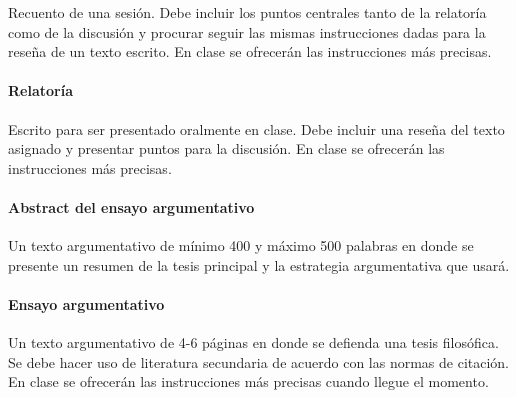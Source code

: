 \documentclass[]{article}
\let\oldparagraph\paragraph
\renewcommand{\paragraph}[1]{\oldparagraph{#1}\mbox{}}
\begin{document}
Recuento de una sesión. Debe incluir los puntos centrales tanto de la
relatoría como de la discusión y  procurar seguir las mismas
instrucciones dadas para la reseña de un texto escrito. En clase se
ofrecerán las instrucciones más precisas.

\paragraph{Relatoría}\label{relatoruxeda}

Escrito para ser presentado oralmente en clase. Debe incluir una reseña
del texto asignado y presentar puntos para la discusión. En clase se
ofrecerán las instrucciones más precisas.

\paragraph{Abstract del ensayo
argumentativo}\label{abstract-del-ensayo-argumentativo}

Un texto argumentativo de mínimo 400 y máximo 500 palabras en donde se
presente un resumen de la tesis principal y la estrategia argumentativa
que usará.

\paragraph{Ensayo argumentativo}\label{ensayo-argumentativo}

Un texto argumentativo de 4-6 páginas en donde se defienda una tesis
filosófica. Se debe hacer uso de literatura secundaria de acuerdo con
las normas de citación. En clase se ofrecerán las instrucciones más
precisas cuando llegue el momento.

\nocite{*}
\printbibliography
\end{document}
